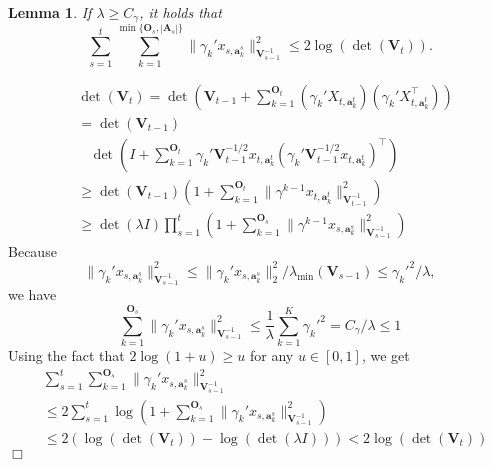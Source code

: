 \documentclass{article}
\newcommand{\bA}{\mathbf{A}}
\newcommand{\ba}{\mathbf{a}}
\newcommand{\bO}{\mathbf{O}}
\newcommand{\bV}{\mathbf{V}}
\newcommand{\abs}[1]{\left| #1 \right|}
\newcommand{\norm}[1]{\| #1 \|}
\newtheorem{lemma}[theorem]{Lemma}%
\newenvironment{proof}{\noindent {\textbf{Proof. }}}{$\Box$ \medskip}
\begin{document}
\begin{lemma}
If $\lambda \geq C_\gamma$, it holds that
$$
\sum_{s=1}^t \sum_{k=1}^{\min\{\bO_s, \abs{\bA_s}\}} \norm{\gamma_k' x_{s,\ba_{k}^s}}_{\bV_{s-1}^{-1}}^2 \leq 2\log(\det(\bV_t)).
$$
\end{lemma}
\begin{proof}
\begin{align*}
&\det(\bV_t) = \det(\bV_{t-1} + \sum_{k=1}^{\bO_t} (\gamma_k' X_{t,\ba_k^{t}})(\gamma_k' X_{t, \ba_k^{t}}^{\top}))\\
&=\det(\bV_{t-1})\\
&~~~~\det(I + \sum_{k=1}^{\bO_t} \gamma_k'\bV_{t-1}^{-1/2}x_{t,\ba_{k}^{t}} (\gamma_k' \bV_{t-1}^{-1/2}x_{t,\ba_{k}^{t}})^{\top})\\
&\geq \det(\bV_{t-1}) (1 + \sum_{k=1}^{\bO_t} \norm{\gamma^{k-1}x_{t,\ba_k^t}}_{\bV_{t-1}^{-1}}^2)\\
&\geq \det(\lambda I)\prod_{s=1}^{t}(1 + \sum_{k=1}^{\bO_s} \norm{\gamma^{k-1}x_{s,\ba_k^s}}_{\bV_{s-1}^{-1}}^2)
\end{align*}
Because
$$
\norm{\gamma_k' x_{s,\ba_k^s}}_{\bV_{s-1}^{-1}}^2 \leq \norm{\gamma_k' x_{s,\ba_k^s}}_2^2/\lambda_{\min}(\bV_{s-1}) \leq \gamma_k'^2 /\lambda,
$$
we have 
$$
\sum_{k=1}^{\bO_s} \norm{\gamma_k' x_{s,\ba_k^s}}_{\bV_{s-1}^{-1}}^2 \leq \frac{1}{\lambda} \sum_{k=1}^{K} \gamma_k'^2 = C_\gamma /\lambda \leq 1
$$
Using the fact that $ 2\log(1+u) \geq u$ for any $u \in [0,1]$, we get
\begin{align*}
&\sum_{s=1}^t \sum_{k=1}^{\bO_s}\norm{\gamma_k' x_{s,\ba_{k}^s}}_{\bV_{s-1}^{-1}}^2 \\
&\leq 2\sum_{s=1}^t\log(1 + \sum_{k=1}^{\bO_s} \norm{\gamma_k' x_{s,\ba_k^s}}_{\bV_{s-1}^{-1}}^2)\\
&\leq 2(\log(\det(\bV_t)) - \log(\det(\lambda I))) < 2\log(\det(\bV_t))
\end{align*}
\end{proof}
	
	
\nocite{langley00}
	


	
\end{document}
